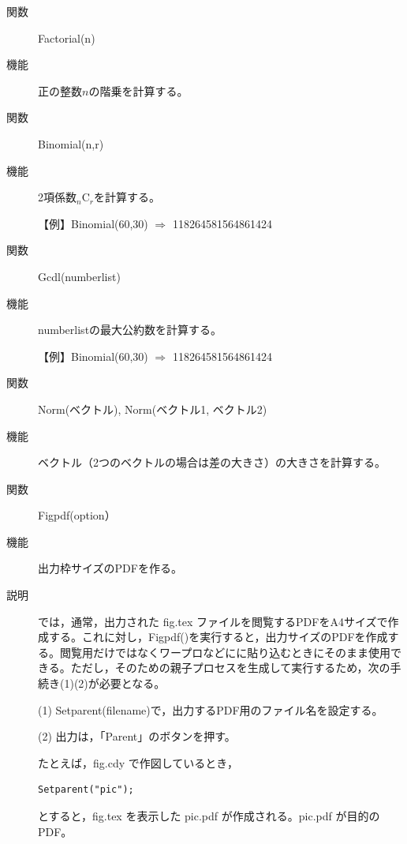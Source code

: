 \documentclass[papersize,a4paper,10pt,uplatex]{jsarticle}
\begin{document}
\begin{description}
\vspace{\baselineskip}

\hypertarget{factorial}{}
\item[関数]Factorial(n)
\item[機能]正の整数$n$の階乗を計算する。

\vspace{\baselineskip}

\hypertarget{binomial}{}
\item[関数]Binomial(n,r)
\item[機能]2項係数${}_n\mathrm{C}_r$を計算する。

\vspace{\baselineskip}
【例】Binomial(60,30) $\Rightarrow$ 118264581564861424

\vspace{\baselineskip}

\hypertarget{gcd}{}
\item[関数]Gcdl(numberlist)
\item[機能]numberlistの最大公約数を計算する。

\vspace{\baselineskip}
【例】Binomial(60,30) $\Rightarrow$ 118264581564861424

\vspace{\baselineskip}

\hypertarget{norm}{}
\item[関数]Norm(ベクトル), Norm(ベクトル1, ベクトル2)
\item[機能]ベクトル（2つのベクトルの場合は差の大きさ）の大きさを計算する。

\vspace{\baselineskip}

\hypertarget{figpdf}{}
\item[関数]Figpdf(option）
\item[機能]出力枠サイズのPDFを作る。
\item[説明]\ketcindy では，通常，出力された fig.tex ファイルを閲覧するPDFをA4サイズで作成する。これに対し，Figpdf()を実行すると，出力サイズのPDFを作成する。閲覧用だけではなくワープロなどにに貼り込むときにそのまま使用できる。ただし，そのための親子プロセスを生成して実行するため，次の手続き(1)(2)が必要となる。

\vspace{\baselineskip}
(1) Setparent(filename)で，出力するPDF用のファイル名を設定する。

(2) 出力は，「Parent」のボタンを押す。

\vspace{\baselineskip}
たとえば，fig.cdy で作図しているとき，
\begin{verbatim}
Setparent("pic");
\end{verbatim}
とすると，fig.tex を表示した pic.pdf が作成される。pic.pdf が目的のPDF。


\end{description}
\end{document}
